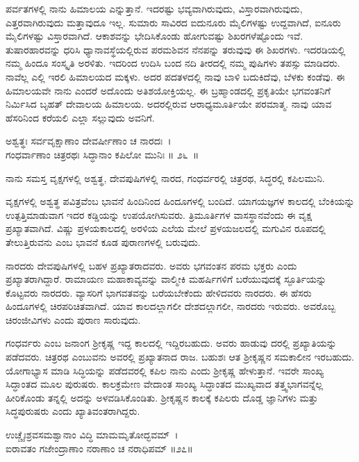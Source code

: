 ಪರ್ವತಗಳಲ್ಲಿ ನಾನು ಹಿಮಾಲಯ ಎನ್ನುತ್ತಾನೆ. ಇದರಷ್ಟು ಭವ್ಯವಾಗಿರುವುದು, ವಿಸ್ತಾರ\-ವಾಗಿರುವುದು, ಎತ್ತರವಾಗಿರುವುದು ಮತ್ತಾವುದೂ ಇಲ್ಲ. ಸುಮಾರು ಸಾವಿರದ ಐದುನೂರು ಮೈಲಿಗಳಷ್ಟು ಉದ್ದವಾಗಿದೆ, ಐನೂರು ಮೈಲಿಗಳಷ್ಟು ವಿಸ್ತಾರವಾಗಿದೆ. ಆಕಾಶವನ್ನು ಭೇದಿಸಿಕೊಂಡು ಹೋಗುವಷ್ಟು ಶಿಖರಗಳೆಷ್ಟೊಂದು ಇವೆ. ತುಷಾರಹಾರವನ್ನು ಧರಿಸಿ ಧ್ಯಾನಾವಸ್ಥೆ\-ಯಲ್ಲಿರುವ ಪರಮಶಿವನ ನೆನಪನ್ನು ತರುವುವು ಈ ಶಿಖರಗಳು. ಇದರಡಿಯಲ್ಲಿ ನಮ್ಮ ಹಿಂದೂ ಸಂಸ್ಕೃತಿ ಅರಳಿತು. ಇದರಿಂದ ಉದಿಸಿ ಬಂದ ನದಿ ತೀರದಲ್ಲಿ ನಮ್ಮ ಪುಷಿಗಳು ತಪಸ್ಸು ಮಾಡಿದರು. ನಾವೆಲ್ಲ ಎಲ್ಲಿ ಇರಲಿ ಹಿಮಾಲಯದ ಮಕ್ಕಳು. ಅದರ ಪದತಳದಲ್ಲಿ ನಾವು ಬಾಳಿ ಬದುಕಿದೆವು, ಬೆಳಕು ಕಂಡೆವು. ಈ ಹಿಮಾಲಯವೇ ನಾನು ಎಂದರೆ ಅದೊಂದು ಅತಿಶಯೋಕ್ತಿಯಲ್ಲ. ಈ ಬ್ರಹ್ಮಾಂಡದಲ್ಲಿ ಪ್ರಕೃತಿಯೇ ಭಗವಂತನಿಗೆ ನಿರ್ಮಿಸಿದ ಬೃಹತ್ ದೇವಾಲಯ ಹಿಮಾಲಯ. ಅದರಲ್ಲಿರುವ ಆರಾಧ್ಯಮೂರ್ತಿಯೇ ಪರಮಾತ್ಮ. ನಾವು ಯಾವ ಹೆಸರಿನಿಂದ ಕರೆಯಲಿ ಎಲ್ಲಾ ಸಲ್ಲುವುದು ಅವನಿಗೆ.

\begin{shloka}
ಅಶ್ವತ್ಥಃ ಸರ್ವವೃಕ್ಷಾಣಾಂ ದೇವರ್ಷೀಣಾಂ ಚ ನಾರದಃ~।\\ಗಂಧರ್ವಾಣಾಂ ಚಿತ್ರರಥಃ ಸಿದ್ಧಾನಾಂ ಕಪಿಲೋ ಮುನಿಃ \hfill॥ ೨೬~॥ 
\end{shloka}

\begin{artha}
ನಾನು ಸಮಸ್ತ ವೃಕ್ಷಗಳಲ್ಲಿ ಅಶ್ವತ್ಥ, ದೇವಪುಷಿಗಳಲ್ಲಿ ನಾರದ, ಗಂಧರ್ವರಲ್ಲಿ ಚಿತ್ರರಥ, ಸಿದ್ಧರಲ್ಲಿ ಕಪಿಲಮುನಿ.
\end{artha}

ವೃಕ್ಷಗಳಲ್ಲಿ ಅಶ್ವತ್ಥ ಪವಿತ್ರವೆಂಬ ಭಾವನೆ ಹಿಂದಿನಿಂದ ಹಿಂದೂಗಳಲ್ಲಿ ಬಂದಿದೆ. ಯಾಗಯಜ್ಞಗಳ ಕಾಲದಲ್ಲಿ ಬೆಂಕಿಯನ್ನು ಉತ್ಪತ್ತಿಮಾಡುವಾಗ ಇದರ ಕಡ್ಡಿಯನ್ನು ಉಪಯೋಗಿಸುವರು. ತ್ರಿಮೂರ್ತಿಗಳ ವಾಸಸ್ಥಾನವೆಂದು ಈ ವೃಕ್ಷ ಪ್ರಖ್ಯಾತವಾಗಿದೆ. ವಿಷ್ಣು ಪ್ರಳಯಕಾಲದಲ್ಲಿ ಅರಳಿಯ ಎಲೆಯ ಮೇಲೆ ಪ್ರಳಯಜಲದಲ್ಲಿ ಮಗುವಿನ ರೂಪದಲ್ಲಿ ತೇಲುತ್ತಿರುವನು ಎಂಬ ಭಾವನೆ ಕೂಡ ಪುರಾಣಗಳಲ್ಲಿ ಬರುವುದು.

ನಾರದರು ದೇವಪುಷಿಗಳಲ್ಲಿ ಬಹಳ ಪ್ರಖ್ಯಾತರಾದವರು. ಅವರು ಭಗವಂತನ ಪರಮ ಭಕ್ತರು ಎಂದು ಪ್ರಖ್ಯಾತರಾಗಿದ್ದಾರೆ. ರಾಮಾಯಣ ಮಹಾಕಾವ್ಯವನ್ನು ವಾಲ್ಮೀಕಿ ಮಹರ್ಷಿಗಳಿಗೆ ಬರೆಯುವುದಕ್ಕೆ ಸ್ಫೂರ್ತಿಯನ್ನು ಕೊಟ್ಟವರು ನಾರದರು. ವ್ಯಾಸರಿಗೆ ಭಾಗವತವನ್ನು ಬರೆಯಬೇಕೆಂದು ಹೇಳಿದವರು ನಾರದರು. ಈ ಹೆಸರು ಹಿಂದೂಗಳಲ್ಲಿ ಚಿರಪರಿಚಿತವಾಗಿದೆ. ಯಾವ ಕಾಲದಲ್ಲಾಗಲೀ ದೇಶದಲ್ಲಾಗಲೀ, ನಾರದರು ಇರುವರು. ಅವರೊಬ್ಬ ಚಿರಂಜೀವಿಗಳು ಎಂದು ಪುರಾಣ ಸಾರುವುದು.

ಗಂಧರ್ವರು ಎಂಬ ಜನಾಂಗ ಶ‍್ರೀಕೃಷ್ಣ ಇದ್ದ ಕಾಲದಲ್ಲಿ ಇದ್ದಿರಬಹುದು. ಅವರು ಹಾಡುವು ದರಲ್ಲಿ ಪ್ರಖ್ಯಾತಿಯನ್ನು ಪಡೆದವರು. ಚಿತ್ರರಥ ಎಂಬುವನು ಅವರಲ್ಲಿ ಪ್ರಖ್ಯಾತನಾದ ರಾಜ. ಬಹುಶಃ ಆತ ಶ‍್ರೀಕೃಷ್ಣನ ಸಮಕಾಲೀನ ಇರಬಹುದು. ಯೋಗಾಭ್ಯಾಸ ಮಾಡಿ ಸಿದ್ಧಿಯನ್ನು ಪಡೆದವರಲ್ಲಿ ಕಪಿಲ ನಾನು ಎಂದು ಶ‍್ರೀಕೃಷ್ಣ ಹೇಳುತ್ತಾನೆ. ಇವರೇ ಸಾಂಖ್ಯ ಸಿದ್ಧಾಂತದ ಮೂಲ ಪುರುಷರು. ಕಾಲಕ್ರಮೇಣ ವೇದಾಂತ ಸಾಂಖ್ಯ ಸಿದ್ಧಾಂತದ ಮುಖ್ಯವಾದ ತತ್ತ್ವಭಾಗವನ್ನೆಲ್ಲ ಹೀರಿಕೊಂಡು ತನ್ನಲ್ಲಿ ಅದನ್ನು ಅಳವಡಿಸಿಕೊಂಡಿತು. ಶ‍್ರೀಕೃಷ್ಣನ ಕಾಲಕ್ಕೆ ಕಪಿಲರು ದೊಡ್ಡ ಜ್ಞಾನಿಗಳು ಮತ್ತು ಸಿದ್ಧಪುರುಷರು ಎಂದು ಖ್ಯಾತಿವಂತರಾಗಿದ್ದರು.

\begin{shloka}
ಉಚ್ಚೈಃಶ್ರವಸಮಶ್ವಾನಾಂ ವಿದ್ಧಿ ಮಾಮಮೃತೋದ್ಭವಮ್~।\\ಐರಾವತಂ ಗಜೇಂದ್ರಾಣಾಂ ನರಾಣಾಂ ಚ ನರಾಧಿಪಮ್ \hfill॥೨೭॥
\end{shloka}

